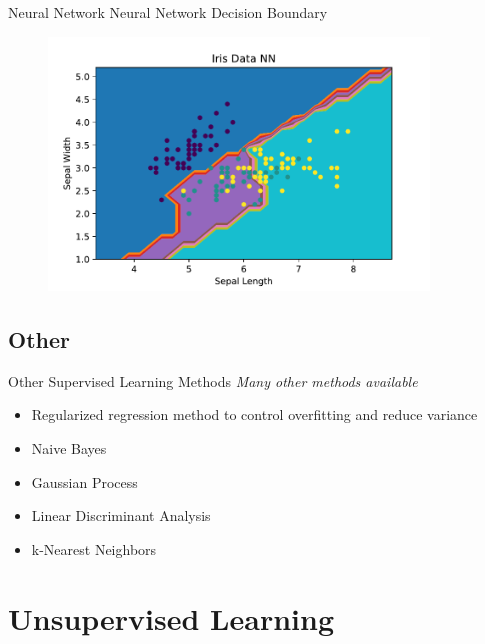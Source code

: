 \documentclass[10pt]{beamer}
\begin{document}
\begin{frame}{Neural Network}
Neural Network Decision Boundary
		\begin{figure}
			\includegraphics[width=0.9\textwidth, center, trim=0cm 0cm 0 0cm]{images/Iris_Data_NN.pdf}
	\end{figure}
\end{frame}

\subsection{Other}
\begin{frame}{Other Supervised Learning Methods}
\emph{Many other methods available}
	\begin{itemize}
		\item Regularized regression method to control overfitting and reduce variance
		\item Naive Bayes
		\item Gaussian Process
		\item Linear Discriminant Analysis
		\item k-Nearest Neighbors
	\end{itemize}
\end{frame}

\section{Unsupervised Learning}
\end{document}
